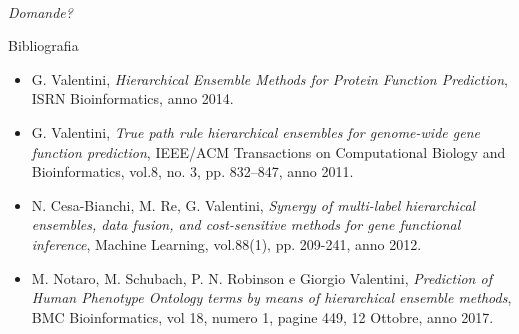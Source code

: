 \documentclass[9pt]{beamer}
\begin{document}
\begin{frame}{}
  \centering \Large
  \emph{\\Domande?}
\end{frame}
\begin{tframe}{Bibliografia}
\begin{itemize}
\item G. Valentini,\emph{ Hierarchical Ensemble Methods for Protein Function Prediction}, ISRN Bioinformatics, anno 2014.
\item G. Valentini, \emph{True path rule hierarchical ensembles for genome-wide gene function prediction}, IEEE/ACM Transactions on Computational Biology and Bioinformatics, vol.8, no. 3, pp. 832–847, anno 2011.
\item N. Cesa-Bianchi, M. Re, G. Valentini, \emph{Synergy of multi-label hierarchical ensembles, data fusion, and cost-sensitive methods for gene functional inference}, Machine Learning, vol.88(1), pp. 209-241, anno 2012.
\item M. Notaro, M. Schubach, P. N. Robinson e Giorgio Valentini, \emph{Prediction of Human Phenotype Ontology terms by means of hierarchical ensemble methods}, BMC Bioinformatics, vol 18, numero 1, pagine 449, 12 Ottobre, anno 2017.
\end{itemize}
\end{tframe}
\end{document}

